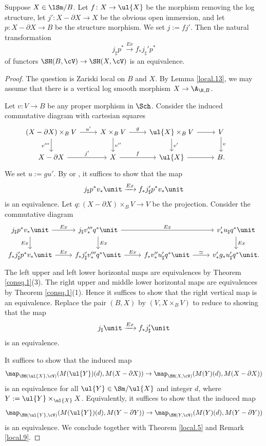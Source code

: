 \documentclass[10pt]{amsart}
\begin{document}
\begin{thm}
\label{local.6}
Suppose $X\in \lSm/B$.
Let $f\colon X\to \ul{X}$ be the morphism removing the log structure, let $j'\colon X-\partial X\to X$ be the obvious open immersion, and let $p\colon X-\partial X\to B$ be the structure morphism.
We set $j:=fj'$.
Then the natural transformation
\[
j_\sharp p^* \xrightarrow{Ex} f_*j_\sharp' p^*
\]
of functors $\SH(B,\cV)\to \SH(X,\cV)$ is an equivalence.
\end{thm}
\begin{proof}
The question is Zariski local on $B$ and $X$.
By Lemma \ref{local.13}, we may assume that there is a vertical log smooth morphism $X\to \A_{\N,B}$.

Let $v\colon V\to B$ be any proper morphism in $\Sch$.
Consider the induced commutative diagram with cartesian squares
\[
\begin{tikzcd}
(X-\partial X)\times_B V\ar[d,"v'''"']\ar[r,"u'"]&
X\times_B V\ar[d,"v''"]\ar[r,"g"]&
\ul{X}\times_B V\ar[d,"v'"]\ar[r]&
V\ar[d,"v"]&
\\
X-\partial X\ar[r,"j'"]&
X\ar[r,"f"]&
\ul{X}\ar[r]&
B.
\end{tikzcd}
\]
We set $u:=gu'$.
By \cite[Lemma 2.2.23]{Ayo07} or \cite[Proposition 4.2.13]{CD19}, it suffices to show that the map
\[
j_\sharp  p^* v_*\unit \xrightarrow{Ex} f_*j_\sharp' p^* v_* \unit
\]
is an equivalence.
Let $q\colon (X-\partial X)\times_B V\to V$ be the projection.
Consider the commutative diagram
\[
\begin{tikzcd}
j_\sharp p^* v_*\unit\ar[d,"Ex"']\ar[r,"Ex"]&
j_\sharp v_*''' q^*\unit\ar[d,"Ex"]\ar[rr,"Ex"]&
&
v_*'u_\sharp q^*\unit\ar[d,"Ex"]
\\
f_*j_\sharp'p^* v_*\unit\ar[r,"Ex"]&
f_*j_\sharp'v_*''' q^*\unit\ar[r,"Ex"]&
f_*v_*''u_\sharp'q^*\unit\ar[r,"\simeq"]&
v_*'g_* u_\sharp'q^*\unit.
\end{tikzcd}
\]
The left upper and left lower horizontal maps are equivalences by Theorem \ref{consq.1}(3).
The right upper and middle lower horizontal maps are equivalences by Theorem \ref{consq.1}(1).
Hence it suffices to show that the right vertical map is an equivalence.
Replace the pair $(B,X)$ by $(V,X\times_B V)$ to reduce to showing that the map
\[
j_\sharp \unit \xrightarrow{Ex} f_*j_\sharp' \unit
\]
is an equivalence.

It suffices to show that the induced map
\[
\map_{\SH(\ul{X},\cV)}
(M(\ul{Y})(d),M(X-\partial X))
\to
\map_{\SH(X,\cV)}
(M(Y)(d),M(X-\partial X))
\]
is an equivalence for all $\ul{Y}\in \Sm/\ul{X}$ and integer $d$, where $Y:=\ul{Y}\times_{\ul{X}}X$.
Equivalently, it suffices to show that the induced map
\[
\map_{\SH(\ul{Y},\cV)}
(M(\ul{Y})(d),M(Y-\partial Y))
\to
\map_{\SH(Y,\cV)}
(M(Y)(d),M(Y-\partial Y))
\]
is an equivalence.
We conclude together with Theorem \ref{local.5} and Remark \ref{local.9}.
\end{proof}
\end{document}
